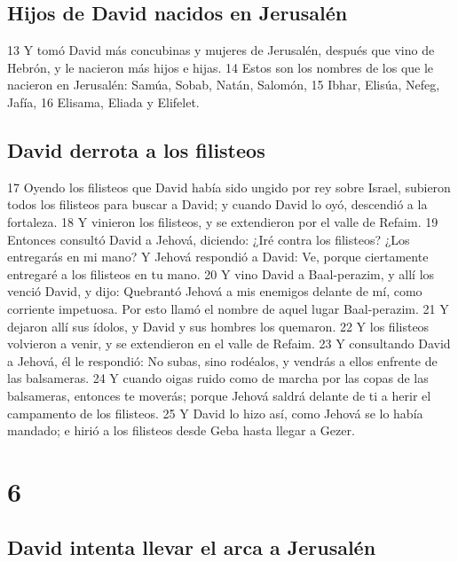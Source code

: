 \section*{Hijos de David nacidos en Jerusalén }

13 Y tomó David más concubinas y mujeres de Jerusalén, después que vino de Hebrón, y le nacieron más hijos e hijas.
14 Estos son los nombres de los que le nacieron en Jerusalén: Samúa, Sobab, Natán, Salomón,
15 Ibhar, Elisúa, Nefeg, Jafía,
16 Elisama, Eliada y Elifelet.

\section*{David derrota a los filisteos}

17 Oyendo los filisteos que David había sido ungido por rey sobre Israel, subieron todos los filisteos para buscar a David; y cuando David lo oyó, descendió a la fortaleza.
18 Y vinieron los filisteos, y se extendieron por el valle de Refaim.
19 Entonces consultó David a Jehová, diciendo: ¿Iré contra los filisteos? ¿Los entregarás en mi mano? Y Jehová respondió a David: Ve, porque ciertamente entregaré a los filisteos en tu mano.
20 Y vino David a Baal-perazim, y allí los venció David, y dijo: Quebrantó Jehová a mis enemigos delante de mí, como corriente impetuosa. Por esto llamó el nombre de aquel lugar Baal-perazim.
21 Y dejaron allí sus ídolos, y David y sus hombres los quemaron.
22 Y los filisteos volvieron a venir, y se extendieron en el valle de Refaim.
23 Y consultando David a Jehová, él le respondió: No subas, sino rodéalos, y vendrás a ellos enfrente de las balsameras.
24 Y cuando oigas ruido como de marcha por las copas de las balsameras, entonces te moverás; porque Jehová saldrá delante de ti a herir el campamento de los filisteos.
25 Y David lo hizo así, como Jehová se lo había mandado; e hirió a los filisteos desde Geba hasta llegar a Gezer.

\chapter{6}

\section*{David intenta llevar el arca a Jerusalén}

